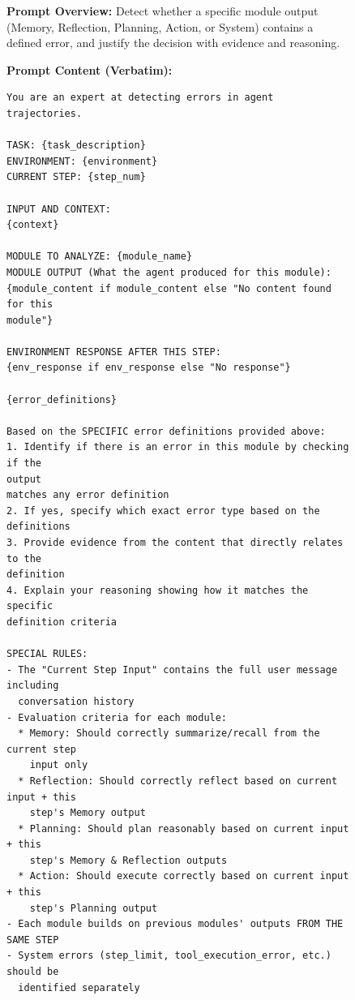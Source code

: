 \begin{figure}[htbp]
\centering
\begin{tcolorbox}[
    title=\textbf{Detector Prompt},
    colback=green!1!white,
    colframe=green!50!black,
    fonttitle=\bfseries
]
\small

\small

\textbf{Prompt Overview:}  
Detect whether a specific module output (Memory, Reflection, Planning, Action, or System) contains a defined error, and justify the decision with evidence and reasoning.

\vspace{2mm}

\textbf{Prompt Content (Verbatim):}
\begin{verbatim}
You are an expert at detecting errors in agent trajectories.

TASK: {task_description}
ENVIRONMENT: {environment}
CURRENT STEP: {step_num}

INPUT AND CONTEXT:
{context}

MODULE TO ANALYZE: {module_name}
MODULE OUTPUT (What the agent produced for this module):
{module_content if module_content else "No content found for this 
module"}

ENVIRONMENT RESPONSE AFTER THIS STEP:
{env_response if env_response else "No response"}

{error_definitions}

Based on the SPECIFIC error definitions provided above:
1. Identify if there is an error in this module by checking if the 
output 
matches any error definition
2. If yes, specify which exact error type based on the definitions
3. Provide evidence from the content that directly relates to the 
definition
4. Explain your reasoning showing how it matches the specific 
definition criteria

SPECIAL RULES:
- The "Current Step Input" contains the full user message including 
  conversation history
- Evaluation criteria for each module:
  * Memory: Should correctly summarize/recall from the current step
    input only
  * Reflection: Should correctly reflect based on current input + this 
    step's Memory output
  * Planning: Should plan reasonably based on current input + this 
    step's Memory & Reflection outputs
  * Action: Should execute correctly based on current input + this 
    step's Planning output
- Each module builds on previous modules' outputs FROM THE SAME STEP
- System errors (step_limit, tool_execution_error, etc.) should be 
  identified separately


\end{verbatim}
\end{tcolorbox}
\end{figure}
